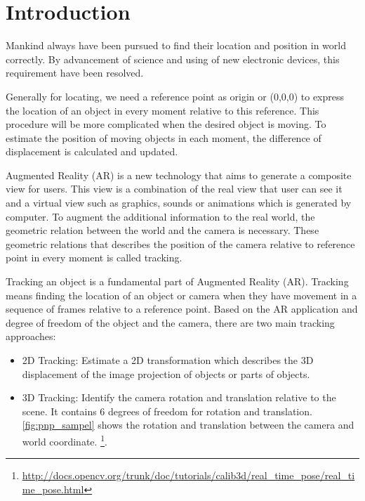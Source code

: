 \chapter{Introduction}\label{chapter:introduction}
Mankind always have been pursued to find their location and position in world correctly. By advancement of science and using of new electronic devices, this requirement have been resolved. 

Generally for locating, we need a reference point as origin or (0,0,0) to express the location of an object in every moment relative to this reference. This procedure will be more complicated when the desired object is moving. To estimate the position of moving objects in each moment, the difference of displacement is calculated and updated.

Augmented Reality (AR) is a new technology that aims to generate a composite view for users. This view is a combination of the real view that user can see it and a virtual view such as graphics, sounds or animations which is generated by computer. To augment the additional information to the real world, the geometric relation between the world and the camera is necessary. These geometric relations that describes the position of the camera relative to reference point in every moment is called tracking.

Tracking an object is a fundamental part of Augmented Reality (AR). Tracking means finding the location of an object or camera when they have movement in a sequence of frames relative to a reference point. Based on the AR application and degree of freedom of the object and the camera, there are two main tracking approaches:

\begin{itemize}
\item 2D Tracking: Estimate a 2D transformation which describes the 3D displacement of the image projection of objects or parts of objects.
\item 3D Tracking: Identify the camera rotation and translation relative to the scene. It contains 6 degrees of freedom for rotation and translation. \autoref{fig:pnp_sampel} shows the rotation and translation between the camera and world coordinate. \footnote{\url{http://docs.opencv.org/trunk/doc/tutorials/calib3d/real_time_pose/real_time_pose.html}}.
\end{itemize}

